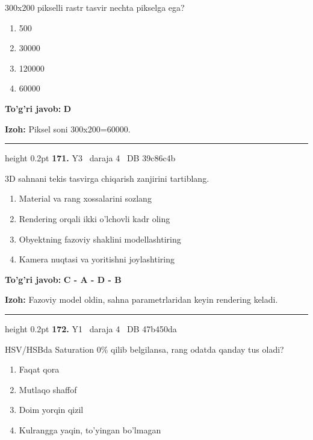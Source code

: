 \documentclass[10pt,a4paper,oneside]{article}
\begin{document}
300x200 pikselli rastr tasvir nechta pikselga ega?
\begin{enumerate}[label=\Alph*),leftmargin=9mm]
\item 500
\item 30000
\item 120000
\item 60000
\end{enumerate}
\begin{tcolorbox}[enhanced,breakable,colback=teal!4,colframe=teal!45!black,boxrule=0.45pt,arc=1.2mm,left=2.8mm,right=2.8mm,top=2mm,bottom=2mm,before skip=2mm,after skip=2mm]
\textbf{\color{teal}To'g'ri javob:} \textbf{D}
\par\smallskip
\textbf{Izoh:} Piksel soni 300x200=60000.
\end{tcolorbox}
\vspace{2mm}\hrule height 0.2pt \vspace{4mm}
\hypertarget{q171}{\textbf{\color{ink}171.}}  {\color{muted}\scriptsize Y3 \textbullet\ daraja 4 \textbullet\ DB 39c86c4b}
\par
3D sahnani tekis tasvirga chiqarish zanjirini tartiblang.
\begin{enumerate}[label=\Alph*),leftmargin=9mm]
\item Material va rang xossalarini sozlang
\item Rendering orqali ikki o'lchovli kadr oling
\item Obyektning fazoviy shaklini modellashtiring
\item Kamera nuqtasi va yoritishni joylashtiring
\end{enumerate}
\begin{tcolorbox}[enhanced,breakable,colback=teal!4,colframe=teal!45!black,boxrule=0.45pt,arc=1.2mm,left=2.8mm,right=2.8mm,top=2mm,bottom=2mm,before skip=2mm,after skip=2mm]
\textbf{\color{teal}To'g'ri javob:} \textbf{C - A - D - B}
\par\smallskip
\textbf{Izoh:} Fazoviy model oldin, sahna parametrlaridan keyin rendering keladi.
\end{tcolorbox}
\vspace{2mm}\hrule height 0.2pt \vspace{4mm}
\hypertarget{q172}{\textbf{\color{ink}172.}}  {\color{muted}\scriptsize Y1 \textbullet\ daraja 4 \textbullet\ DB 47b450da}
\par
HSV/HSBda Saturation 0\% qilib belgilansa, rang odatda qanday tus oladi?
\begin{enumerate}[label=\Alph*),leftmargin=9mm]
\item Faqat qora
\item Mutlaqo shaffof
\item Doim yorqin qizil
\item Kulrangga yaqin, to'yingan bo'lmagan
\end{enumerate}
\end{document}
